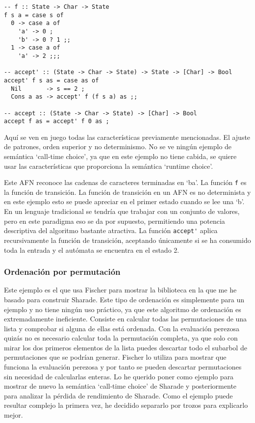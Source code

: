 \documentclass[class=article, crop=false]{standalone}
\begin{document}
\begin{verbatim}
-- f :: State -> Char -> State
f s a = case s of
  0 -> case a of
    'a' -> 0 ;
    'b' -> 0 ? 1 ;;
  1 -> case a of
    'a' -> 2 ;;;

-- accept' :: (State -> Char -> State) -> State -> [Char] -> Bool
accept' f s as = case as of
  Nil       -> s == 2 ;
  Cons a as -> accept' f (f s a) as ;;

-- accept :: (State -> Char -> State) -> [Char] -> Bool
accept f as = accept' f 0 as ;
\end{verbatim}

Aquí se ven en juego todas las características previamente mencionadas. El ajuste de
patrones, orden superior y no determinismo. No se ve ningún ejemplo de semántica `call-time
choice', ya que en este ejemplo no tiene cabida, se quiere usar las características que
proporciona la semántica `runtime choice'.

Este AFN reconoce las cadenas de caracteres terminadas en `ba'. La función \verb`f` es la
función de transición. La función de transición en un AFN es no determinista y en este
ejemplo esto se puede apreciar en el primer estado cuando se lee una `b'. En un lenguaje
tradicional se tendría que trabajar con un conjunto de valores, pero en este paradigma eso se
da por supuesto, permitiendo una potencia descriptiva del algoritmo bastante atractiva. La
función \verb`accept'` aplica recursivamente la función de transición, aceptando únicamente
si se ha consumido toda la entrada y el autómata se encuentra en el estado 2.

\subsubsection{Ordenación por permutación}

Este ejemplo es el que usa Fischer para mostrar la biblioteca en la que me he basado para
construir Sharade. Este tipo de ordenación es simplemente para un ejemplo y no tiene
ningún uso práctico, ya que este algoritmo de ordenación es extremadamente ineficiente.
Consiste en calcular todas las permutaciones de una lista y comprobar si alguna de ellas está
ordenada. Con la evaluación perezosa quizás no es necesario calcular toda la permutación
completa, ya que solo con mirar los dos primeros elementos de la lista puedes descartar todo
el subarbol de permutaciones que se podrían generar. Fischer lo utiliza para mostrar que
funciona la evaluación perezosa y por tanto se pueden descartar permutaciones sin necesidad
de calcularlas enteras. Lo he querido poner como ejemplo para mostrar de nuevo la semántica
`call-time choice' de Sharade y posteriormente para analizar la pérdida de rendimiento de
Sharade. Como el ejemplo puede resultar complejo la primera vez, he decidido separarlo por
trozos para explicarlo mejor.
\end{document}
